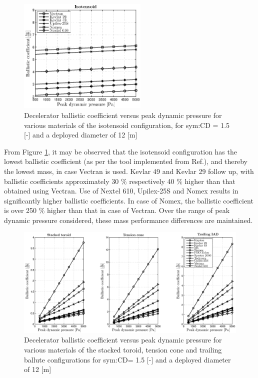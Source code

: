\begin{figure}[H]
\centering
\includegraphics[width = 0.55\textwidth]{Figure/ISO_mat.eps}
\caption{Decelerator ballistic coefficient versus peak dynamic pressure for various materials of the isotensoid configuration, for \gls{sym:CD} = 1.5 [-] and a deployed diameter of 12 [m]}
\label{fig:ISO_mat}
\end{figure}
From Figure \ref{fig:ISO_mat}, it may be observed that the isotensoid configuration has the lowest ballistic coefficient (as per the tool implemented from Ref.\cite{Anderson1969}), and thereby the lowest mass, in case Vectran is used. Kevlar 49 and Kevlar 29 follow up, with ballistic coefficients approximately 30 $\%$ respectively 40 $\%$ higher than that obtained using Vectran. Use of Nextel 610, Upilex-25S and Nomex results in significantly higher ballistic coefficients. In case of Nomex, the ballistic coefficient is over 250 $\%$ higher than that in case of Vectran. Over the range of peak dynamic pressure considered, these mass performance differences are maintained. 

\begin{figure}[H]
\hspace{-35mm}
\includegraphics[width = 1.35\textwidth]{Figure/all_mat.eps}
\caption{Decelerator ballistic coefficient versus peak dynamic pressure for various materials of the stacked toroid, tension cone and trailing ballute configurations for \gls{sym:CD}= 1.5 [-] and a deployed diameter of 12 [m]}
\label{fig:all_mat}
\end{figure}

